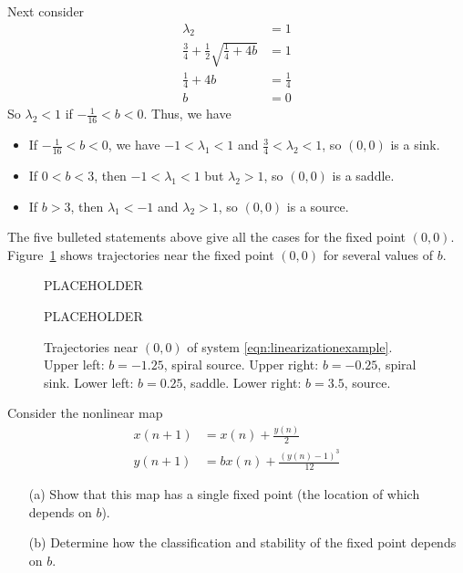 \begin{xexample}
Next consider
\begin{equation}
\begin{split}
   \lambda_2 & = 1 \\
   \frac{3}{4} + \frac{1}{2} \sqrt{\frac{1}{4}+4b} & = 1 \\
   \frac{1}{4}+4b & = \frac{1}{4} \\
   b & = 0
\end{split}
\end{equation}
So $\lambda_2 < 1$ if $-\frac{1}{16} < b < 0$.
Thus, we have
\begin{itemize}
\item
If $-\frac{1}{16} < b < 0$, we have $-1 < \lambda_1 < 1$ and $\frac{3}{4} < \lambda_2 < 1$, so
$(0,0)$ is a sink.
\item
If $0 < b < 3$, then $-1 < \lambda_1 < 1$ but $\lambda_2 > 1$, so 
$(0,0)$ is a saddle.
\item
If $b > 3$, then $\lambda_1 < -1$ and $\lambda_2 > 1$, so
$(0,0)$ is a source.
\end{itemize}
The five bulleted statements above give all the cases for the
fixed point $(0,0)$.
Figure~\ref{fig:LinearizationFPExamples} shows trajectories
near the fixed point $(0,0)$ for several values of $b$.
\begin{figure}
\centerline{%
PLACEHOLDER
}
\centerline{%
PLACEHOLDER
}
\caption{Trajectories near $(0,0)$ of system
\eqref{eqn:linearizationexample}. Upper left: $b=-1.25$, spiral source.
Upper right: $b=-0.25$, spiral sink.
Lower left: $b=0.25$, saddle.
Lower right: $b=3.5$, source.}
\label{fig:LinearizationFPExamples}
\end{figure}
\end{xexample}

\newpage

\begin{exercises}
\begin{exercise}
\label{ex:nonlinmap1}
Consider the nonlinear map
\begin{equation}
\begin{split}
  x(n+1) & = x(n) + \frac{y(n)}{2} \\
  y(n+1) & = bx(n) + \frac{(y(n)-1)^3}{12}
\end{split}
\end{equation}
\begin{enumerate}
\item[(a)]
Show that this map has a single fixed point
(the location of which depends on $b$).
\item[(b)]
Determine how the classification and stability
of the fixed point depends on $b$.
\end{enumerate}
\end{exercise}
\end{exercises}

